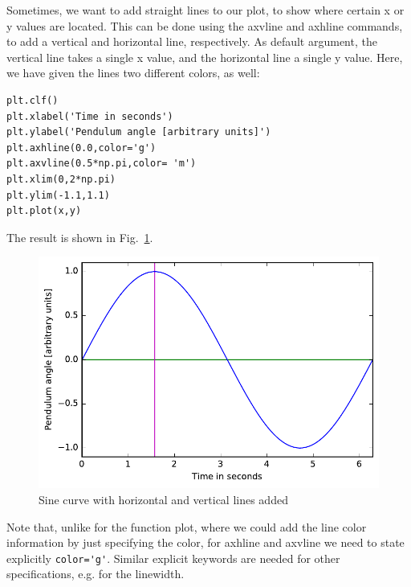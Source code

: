\documentclass[twocolumn,apj]{openjournal}
\begin{document}
Sometimes, we want to add straight lines to our plot, to show where certain x or y values are located. This can be done using the axvline and axhline commands, to add a vertical and horizontal line, respectively. As default argument, the vertical line takes a single x value, and the horizontal line a single y value. Here, we have given the lines two different colors, as well:
\begin{lstlisting}
plt.clf()
plt.xlabel('Time in seconds')
plt.ylabel('Pendulum angle [arbitrary units]')
plt.axhline(0.0,color='g')
plt.axvline(0.5*np.pi,color= 'm')
plt.xlim(0,2*np.pi)
plt.ylim(-1.1,1.1)
plt.plot(x,y)
\end{lstlisting}
The result is shown in Fig.~\ref{SinPlotLines}.
\begin{figure}[htbp]
\begin{center}
\includegraphics[width=\linewidth]{sinplot-extralines.pdf}
\caption{Sine curve with horizontal and vertical lines added}
\label{SinPlotLines}
\end{center}
\end{figure}
Note that, unlike for the function plot, where we could add the line color information by just specifying the color, for axhline and axvline we need to state explicitly \verb|color='g'|. Similar explicit keywords are needed for other specifications, e.g. for the linewidth.
\end{document}
